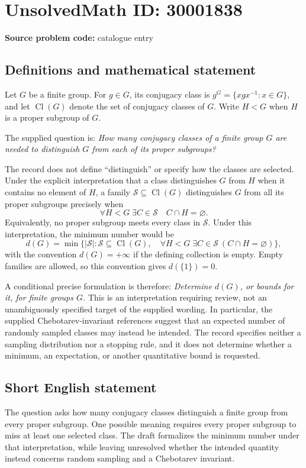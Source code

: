 \documentclass[11pt]{article}
\begin{document}
\section*{UnsolvedMath ID: 30001838}
\textbf{Source problem code:} catalogue entry
\subsection{Definitions and mathematical statement}
Let \(G\) be a finite group. For \(g\in G\), its conjugacy class is \(g^G=\{xgx^{-1}:x\in G\}\), and let \(\operatorname{Cl}(G)\) denote the set of conjugacy classes of \(G\). Write \(H<G\) when \(H\) is a proper subgroup of \(G\).

The supplied question is: \emph{How many conjugacy classes of a finite group \(G\) are needed to distinguish \(G\) from each of its proper subgroups?}

The record does not define ``distinguish'' or specify how the classes are selected. Under the explicit interpretation that a class distinguishes \(G\) from \(H\) when it contains no element of \(H\), a family \(\mathcal S\subseteq\operatorname{Cl}(G)\) distinguishes \(G\) from all its proper subgroups precisely when
\[
  \forall H<G\;\exists C\in\mathcal S\quad C\cap H=\varnothing.
\]
Equivalently, no proper subgroup meets every class in \(\mathcal S\). Under this interpretation, the minimum number would be
\[
 d(G)=\min\bigl\{|\mathcal S|:\mathcal S\subseteq\operatorname{Cl}(G),\quad
 \forall H<G\;\exists C\in\mathcal S\ (C\cap H=\varnothing)\bigr\},
\]
with the convention \(d(G)=+\infty\) if the defining collection is empty. Empty families are allowed, so this convention gives \(d(\{1\})=0\).

A conditional precise formulation is therefore: \emph{Determine \(d(G)\), or bounds for it, for finite groups \(G\).} This is an interpretation requiring review, not an unambiguously specified target of the supplied wording. In particular, the supplied Chebotarev-invariant references suggest that an expected number of randomly sampled classes may instead be intended. The record specifies neither a sampling distribution nor a stopping rule, and it does not determine whether a minimum, an expectation, or another quantitative bound is requested.
\subsection{Short English statement}
The question asks how many conjugacy classes distinguish a finite group from every proper subgroup. One possible meaning requires every proper subgroup to miss at least one selected class. The draft formalizes the minimum number under that interpretation, while leaving unresolved whether the intended quantity instead concerns random sampling and a Chebotarev invariant.
\end{document}
